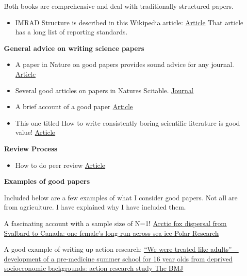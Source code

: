 \documentclass[
  titlepage]{book}
\providecommand{\tightlist}{%
  \setlength{\itemsep}{0pt}\setlength{\parskip}{0pt}}
\begin{document}
Both books are comprehensive and deal with traditionally structured papers.

\begin{itemize}
\tightlist
\item
  IMRAD Structure is described in this Wikipedia article:
  \href{https://en.wikipedia.org/wiki/IMRAD}{Article} That article has a long list of reporting standards.
\end{itemize}

\textbf{General advice on writing science papers}

\begin{itemize}
\item
  A paper in Nature on good papers provides sound advice for any journal. \href{https://media.nature.com/original/magazine-assets/d41586-018-02404-4/d41586-018-02404-4.pdf}{Article}
\item
  Several good articles on papers in Natures Scitable. \href{https://www.nature.com/scitable/topic/scientific-communication-14121566/}{Journal}
\item
  A brief account of a good paper \href{https://www.nature.com/articles/nmeth.4532}{Article}
\item
  This one titled How to write consistently boring scientific literature is good value! \href{https://onlinelibrary.wiley.com/doi/pdf/10.1111/j.0030-1299.2007.15674.x}{Article}
\end{itemize}

\textbf{Review Process}

\begin{itemize}
\tightlist
\item
  How to do peer review \href{https://www.nature.com/articles/d41586-018-06991-0}{Article}
\end{itemize}

\textbf{Examples of good papers}

Included below are a few examples of what I consider good papers. Not all are from agriculture. I have explained why I have included them.

A fascinating account with a sample size of N=1! \href{https://polarresearch.net/index.php/polar/article/view/3512}{Arctic fox dispersal from Svalbard to Canada: one female's long run across sea ice \textbar{} Polar Research}

A good example of writing up action research: \href{https://www.bmj.com/content/332/7544/762}{``We were treated like adults''---development of a pre-medicine summer school for 16 year olds from deprived socioeconomic backgrounds: action research study \textbar{} The BMJ}
\end{document}
